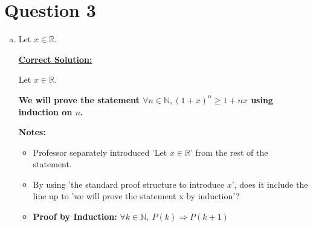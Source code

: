 \documentclass[12pt]{article}
\begin{document}
\section*{Question 3}
\begin{enumerate}[a.]
    \item
    Let $x \in \mathbb{R}$.

    \begin{mdframed}
        \underline{\textbf{Correct Solution:}}

        \bigskip

        Let $x \in \mathbb{R}$.

        \bigskip

        \color{red}
        \textbf{We will prove the statement $\forall n \in \mathbb{N}, (1+x)^n \geq 1 + nx$
        using induction on $n$.}
        \color{black}

    \end{mdframed}

    \textbf{Notes:}
    \begin{itemize}
        \item Professor separately introduced 'Let $x \in \mathbb{R}$' from
        the rest of the statement.
        \item By using 'the standard proof structure to introduce $x$', does it
        include the line up to 'we will prove the statement x by induction'?
        \item \textbf{Proof by Induction:} $\forall k \in \mathbb{N},\:P(k) \Rightarrow P(k+1)$
    \end{itemize}

\end{enumerate}
\end{document}
